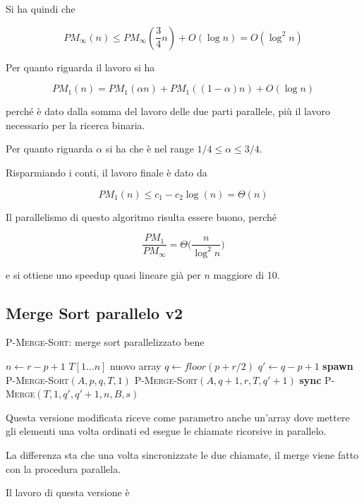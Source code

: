 Si ha quindi che

$$
PM_\infty(n) \leq PM_\infty(\frac{3}{4}n) + O(\log n) = O(\log^2 n)
$$

Per quanto riguarda il lavoro si ha

$$
PM_1(n) = PM_1(\alpha n) + PM_1( (1-\alpha) n) + O(\log n)
$$

perché è dato dalla somma del lavoro delle due parti parallele, più il lavoro necessario per la ricerca binaria.

Per quanto riguarda $\alpha$ si ha che è nel range $1/4 \leq \alpha \leq 3/4$.

Risparmiando i conti, il lavoro finale è dato da

$$
PM_1(n) \leq c_1 - c_2 \log (n) = \Theta (n)
$$

Il parallelismo di questo algoritmo risulta essere buono, perché

$$
\frac{PM_1}{PM_\infty} = \Theta \Big(\frac{n}{\log^2 n}\Big)
$$

e si ottiene uno speedup quasi lineare già per $n$ maggiore di 10.

\subsection{Merge Sort parallelo v2}\label{merge-sort-parallelo-v2}

\begin{breakablealgorithm}
	\caption{\textsc{P-Merge-Sort}: merge sort parallelizzato bene}
	\begin{algorithmic}[1]
\State $n \gets r - p +1$
    \State \Return
\EndIf 
{}
    \State $T[1 \ldots n] $ nuovo array
    \State $q \gets floor(p+r/2)$
    \State $q' \gets q - p +1$
    \State \textbf{spawn } \textsc{P-Merge-Sort}$(A,p,q, T, 1)$
    \State \textsc{P-Merge-Sort}$(A,q+1,r, T, q'+1)$
    \State \textbf{sync}
    \State \textsc{P-Merge}$(T, 1, q', q'+1, n, B, s)$
\EndIf
\EndFunction
\end{algorithmic}
\end{breakablealgorithm}

Questa versione modificata riceve come parametro anche un'array dove mettere gli elementi una volta ordinati ed esegue le chiamate ricorsive in parallelo.

La differenza sta che una volta sincronizzate le due chiamate, il merge viene fatto con la procedura parallela.

Il lavoro di questa versione è

